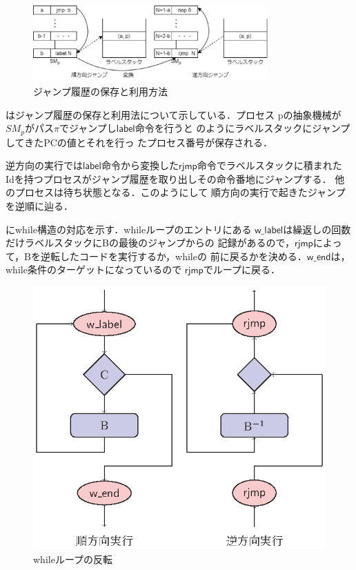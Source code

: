 \documentclass[submit,PRO]{ipsj}
\newcommand{\bcode}[1]{$\mathsf{#1}$}
\begin{document}
\begin{figure}[tb]
\includegraphics[height=3.0cm,width=9.0cm]{jmp.eps}
\caption{ジャンプ履歴の保存と利用方法}
\label{fig:jmp}
\end{figure}

はジャンプ履歴の保存と利用法について示している．プロセス
pの抽象機械が$SM_p$がパス$\pi$でジャンプし\bcode{label}命令を行うと
のようにラベルスタックにジャンプしてきたPCの値とそれを行っ
たプロセス番号が保存される．

逆方向の実行では\bcode{label}命令から変換した\bcode{rjmp}命令でラベルスタックに積まれた
Idを持つプロセスがジャンプ履歴を取り出しその命令番地にジャンプする．
他のプロセスは待ち状態となる．このようにして
順方向の実行で起きたジャンプを逆順に辿る．

にwhile構造の対応を示す．whileループのエントリにある
\bcode{w\_label}は繰返しの回数だけラベルスタックにBの最後のジャンプからの
記録があるので，\bcode{rjmp}によって，Bを逆転したコードを実行するか，whileの
前に戻るかを決める．\bcode{w\_end}は，while条件のターゲットになっているので
\bcode{rjmp}でループに戻る．

\begin{figure}[tb]
\begin{center}
\includegraphics[width=.75\linewidth]{./while-flow.eps}
\end{center}
\caption{whileループの反転}
\label{fig:whileFlow}
\end{figure}
\end{document}
